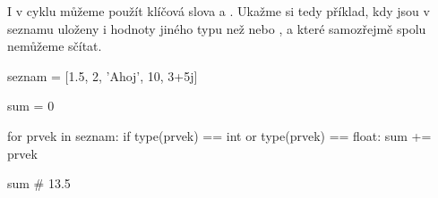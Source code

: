 


I v cyklu  můžeme použít klíčová slova  a . Ukažme si tedy příklad, kdy jsou
v seznamu uloženy i hodnoty jiného typu než  nebo , a které samozřejmě spolu nemůžeme sčítat.

\begin{python}
seznam = [1.5, 2, 'Ahoj', 10, 3+5j]

sum = 0

for prvek in seznam:
    if type(prvek) == int or type(prvek) == float:
       sum += prvek

sum # 13.5
\end{python}

